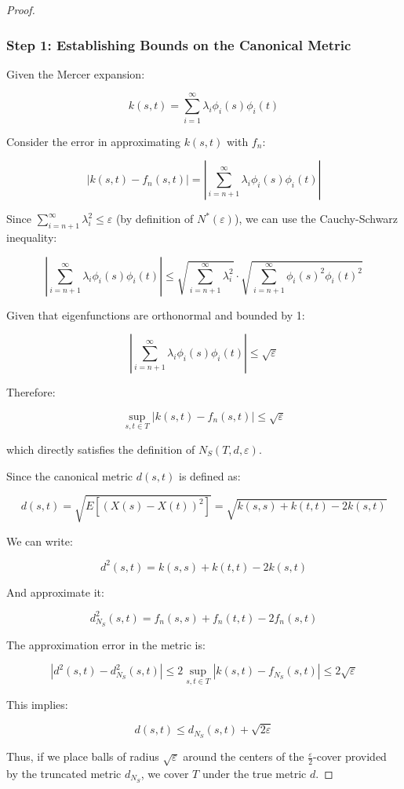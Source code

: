 \begin{proof}

\subsubsection*{Step 1: Establishing Bounds on the Canonical Metric}

Given the Mercer expansion:

\[k(s,t) = \sum_{i=1}^{\infty} \lambda_i \phi_i(s) \phi_i(t)\]

Consider the error in approximating $k(s,t)$ with $f_n$:

\[|k(s,t) - f_n(s,t)| = \left|\sum_{i=n+1}^{\infty} \lambda_i \phi_i(s) \phi_i(t)\right|\]

Since $\sum_{i=n+1}^{\infty} \lambda_i^2 \leq \varepsilon$ (by definition of $N^*(\varepsilon)$), we can use the Cauchy-Schwarz inequality:

\[\left|\sum_{i=n+1}^{\infty} \lambda_i \phi_i(s) \phi_i(t)\right| \leq \sqrt{\sum_{i=n+1}^{\infty} \lambda_i^2} \cdot \sqrt{\sum_{i=n+1}^{\infty} \phi_i(s)^2 \phi_i(t)^2}\]

Given that eigenfunctions are orthonormal and bounded by 1:

\[\left|\sum_{i=n+1}^{\infty} \lambda_i \phi_i(s) \phi_i(t)\right| \leq \sqrt{\varepsilon}\]

Therefore:

\[\sup_{s,t \in T} |k(s,t) - f_n(s,t)| \leq \sqrt{\varepsilon}\]

which directly satisfies the definition of $N_S(T,d,\varepsilon)$.

Since the canonical metric $d(s,t)$ is defined as:

\[d(s,t) = \sqrt{E[(X(s) - X(t))^2]} = \sqrt{k(s,s) + k(t,t) - 2k(s,t)}\]

We can write:

\[d^2(s,t) = k(s,s) + k(t,t) - 2k(s,t)\]

And approximate it:

\[d^2_{N_S}(s,t) = f_n(s,s) + f_n(t,t) - 2f_n(s,t)\]

The approximation error in the metric is:

\[|d^2(s,t) - d^2_{N_S}(s,t)| \leq 2 \sup_{s,t \in T} |k(s,t) - f_{N_S}(s,t)| \leq 2\sqrt{\varepsilon}\]

This implies:

\[d(s,t) \leq d_{N_S}(s,t) + \sqrt{2\varepsilon}\]

Thus, if we place balls of radius $\sqrt{\varepsilon}$ around the centers of the $\frac{\varepsilon}{2}$-cover provided by the truncated metric $d_{N_S}$, we cover $T$ under the true metric $d$. 


\end{proof}
